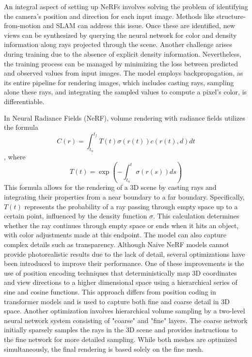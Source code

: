 An integral aspect of setting up NeRFs involves solving the problem of identifying the camera's position and direction for each input image. Methods like structure-from-motion and SLAM can address this issue. Once these are identified, new views can be synthesized by querying the neural network for color and density information along rays projected through the scene. 
Another challenge arises during training due to the absence of explicit density information. Nevertheless, the training process can be managed by minimizing the loss between predicted and observed values from input images. The model employs backpropagation, as its entire pipeline for rendering images, which includes casting rays, sampling alone these rays, and integrating the sampled values to compute a pixel's color, is differentiable.

In Neural Radiance Fields (NeRF), volume rendering with radiance fields utilizes the formula \[ C(r) = \int_{t_n}^{t_f} T(t)\sigma(r(t))c(r(t), d)dt \], where \[ T(t) = \exp\left(-\int_{t_n}^t \sigma(r(s))ds\right) \] This formula allows for the rendering of a 3D scene by casting rays and integrating their properties from a near boundary to a far boundary. Specifically, \( T(t) \) represents the probability of a ray passing through empty space up to a certain point, influenced by the density function \( \sigma \). This calculation determines whether the ray continues through empty space or ends when it hits an object, with color adjustments made at this endpoint. The model can also capture complex details such as transparency. Although Naive NeRF models cannot provide photorealistic results due to the lack of detail, several optimizations have been introduced to improve their performance. One of these improvements is the use of position encoding techniques that deterministically map 3D coordinates and view directions to a higher dimensional space using a hierarchical series of sine and cosine functions. This approach differs from position coding in transformer models and is used to capture both fine and coarse detail in 3D space. Another optimization involves hierarchical volume sampling by a two-level neural network system consisting of "coarse" and "fine" layers. The coarse network initially sparsely samples the rays in the 3D scene and provides instructions to the fine network for more detailed sampling. While both meshes are optimized simultaneously, the final rendering is based solely on the fine mesh.

